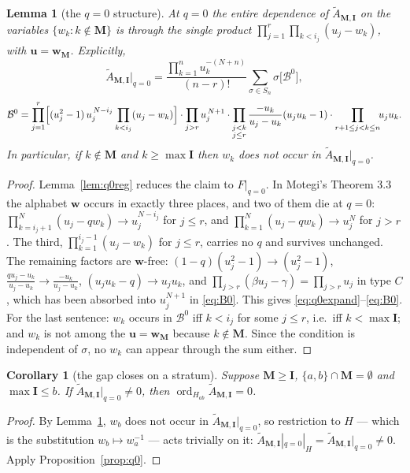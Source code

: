 \documentclass[11pt]{article}
\theoremstyle{plain}
\newtheorem{lem}[thm]{Lemma}
\newtheorem{cor}[thm]{Corollary}
\theoremstyle{definition}
\theoremstyle{remark}
\theoremstyle{plain}
\newcommand{\bI}{\mathbf{I}}
\newcommand{\bM}{\mathbf{M}}
\newcommand{\bu}{\mathbf{u}}
\newcommand{\bw}{\mathbf{w}}
\newcommand{\At}{\widetilde{A}}
\newcommand{\ord}{\operatorname{ord}}
\begin{document}
\begin{lem}[the $q=0$ structure]\label{lem:q0struct}
At $q=0$ the entire dependence of $\At_{\bM,\bI}$ on the variables
$\{w_k:k\notin\bM\}$ is through the single product
$\prod_{j=1}^{r}\prod_{k<i_j}(u_j-w_k)$, with $\bu=\bw_{\bM}$.  Explicitly,
\begin{equation}
\At_{\bM,\bI}\big|_{q=0}
=\frac{\prod_{k=1}^{n}u_k^{-(N+n)}}{(n-r)!}
 \sum_{\sigma\in S_n}\sigma\bigl[\mathcal{B}^0\bigr],
\label{eq:q0expand}
\end{equation}
\begin{equation}
\mathcal{B}^0=\prod_{j=1}^{r}\Bigl[(u_j^2-1)\,u_j^{\,N-i_j}
\prod_{k<i_j}(u_j-w_k)\Bigr]\cdot
\prod_{j>r}u_j^{\,N+1}\cdot
\prod_{\substack{j<k\\ j\le r}}\frac{-u_k}{u_j-u_k}(u_ju_k-1)\cdot
\prod_{r+1\le j<k\le n}\!\!u_ju_k .
\label{eq:B0}
\end{equation}
In particular, if $k\notin\bM$ and $k\ge\max\bI$ then $w_k$ does not occur in
$\At_{\bM,\bI}|_{q=0}$.
\end{lem}
\begin{proof}
Lemma~\ref{lem:q0reg} reduces the claim to $F|_{q=0}$.  In Motegi's Theorem 3.3
the alphabet $\bw$ occurs in exactly three places, and two of them die at $q=0$:
$\prod_{k=i_j+1}^{N}(u_j-qw_k)\to u_j^{N-i_j}$ for $j\le r$, and
$\prod_{k=1}^{N}(u_j-qw_k)\to u_j^{N}$ for $j>r$.  The third,
$\prod_{k=1}^{i_j-1}(u_j-w_k)$ for $j\le r$, carries no $q$ and survives
unchanged.  The remaining factors are $\bw$-free:
$(1-q)(u_j^2-1)\to(u_j^2-1)$,
$\frac{qu_j-u_k}{u_j-u_k}\to\frac{-u_k}{u_j-u_k}$,
$(u_ju_k-q)\to u_ju_k$, and
$\prod_{j>r}(\beta u_j-\gamma)=\prod_{j>r}u_j$ in type $C$, which has been
absorbed into $u_j^{N+1}$ in \eqref{eq:B0}.  This gives
\eqref{eq:q0expand}--\eqref{eq:B0}.  For the last sentence: $w_k$ occurs in
$\mathcal{B}^0$ iff $k<i_j$ for some $j\le r$, i.e.\ iff $k<\max\bI$; and $w_k$
is not among the $\bu=\bw_{\bM}$ because $k\notin\bM$.  Since the condition is
independent of $\sigma$, no $w_k$ can appear through the sum either.
\end{proof}

\begin{cor}[the gap closes on a stratum]\label{cor:stratum}
Suppose $\bM\ge\bI$, $\{a,b\}\cap\bM=\emptyset$ and $\max\bI\le b$.  If
$\At_{\bM,\bI}|_{q=0}\ne0$, then $\ord_{H_{ab}}\At_{\bM,\bI}=0$.
\end{cor}
\begin{proof}
By Lemma~\ref{lem:q0struct}, $w_b$ does not occur in $\At_{\bM,\bI}|_{q=0}$, so
restriction to $H$ --- which is the substitution $w_b\mapsto w_a^{-1}$ --- acts
trivially on it:
$\At_{\bM,\bI}|_{q=0}|_H=\At_{\bM,\bI}|_{q=0}\ne0$.  Apply
Proposition~\ref{prop:q0}.
\end{proof}
\end{document}
